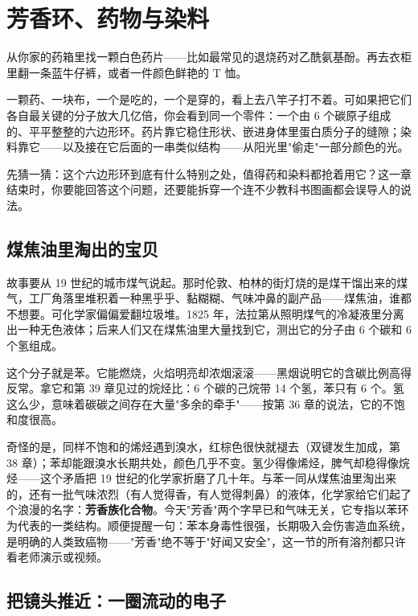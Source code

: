 \chapter{芳香环、药物与染料}

\begin{kaichang}
从你家的药箱里找一颗白色药片——比如最常见的退烧药对乙酰氨基酚。再去衣柜里翻一条蓝牛仔裤，或者一件颜色鲜艳的 T 恤。

一颗药、一块布，一个是吃的，一个是穿的，看上去八竿子打不着。可如果把它们各自最关键的分子放大几亿倍，你会看到同一个零件：一个由 6 个碳原子组成的、平平整整的六边形环。药片靠它稳住形状、嵌进身体里蛋白质分子的缝隙；染料靠它——以及接在它后面的一串类似结构——从阳光里"偷走"一部分颜色的光。

先猜一猜：这个六边形环到底有什么特别之处，值得药和染料都抢着用它？这一章结束时，你要能回答这个问题，还要能拆穿一个连不少教科书图画都会误导人的说法。
\end{kaichang}

\section{煤焦油里淘出的宝贝}

故事要从 19 世纪的城市煤气说起。那时伦敦、柏林的街灯烧的是煤干馏出来的煤气，工厂角落里堆积着一种黑乎乎、黏糊糊、气味冲鼻的副产品——煤焦油，谁都不想要。可化学家偏偏爱翻垃圾堆。1825 年，法拉第从照明煤气的冷凝液里分离出一种无色液体；后来人们又在煤焦油里大量找到它，测出它的分子由 6 个碳和 6 个氢组成。

这个分子就是苯。它能燃烧，火焰明亮却浓烟滚滚——黑烟说明它的含碳比例高得反常。拿它和第 39 章见过的烷烃比：6 个碳的己烷带 14 个氢，苯只有 6 个。氢这么少，意味着碳碳之间存在大量"多余的牵手"——按第 36 章的说法，它的不饱和度很高。

奇怪的是，同样不饱和的烯烃遇到溴水，红棕色很快就褪去（双键发生加成，第 38 章）；苯却能跟溴水长期共处，颜色几乎不变。氢少得像烯烃，脾气却稳得像烷烃——这个矛盾把 19 世纪的化学家折磨了几十年。与苯一同从煤焦油里淘出来的，还有一批气味浓烈（有人觉得香，有人觉得刺鼻）的液体，化学家给它们起了个浪漫的名字：\textbf{芳香族化合物}。今天"芳香"两个字早已和气味无关，它专指以苯环为代表的一类结构。顺便提醒一句：苯本身毒性很强，长期吸入会伤害造血系统，是明确的人类致癌物——"芳香"绝不等于"好闻又安全"，这一节的所有溶剂都只许看老师演示或视频。

\section{把镜头推近：一圈流动的电子}

